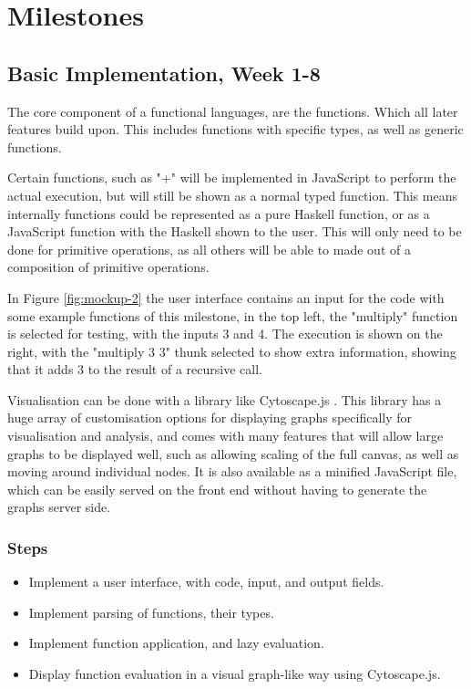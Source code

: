 \documentclass[a4paper]{article}
\begin{document}
\section{Milestones}
\subsection{Basic Implementation, Week 1-8}
The core component of a functional languages, are the functions. Which all later features build upon. This includes functions with specific types, as well as generic functions.

Certain functions, such as "+" will be implemented in JavaScript to perform the actual execution, but will still be shown as a normal typed function. This means internally functions could be represented as a pure Haskell function, or as a JavaScript function with the Haskell shown to the user. This will only need to be done for primitive operations, as all others will be able to made out of a composition of primitive operations.

In Figure \ref{fig:mockup-2} the user interface contains an input for the code with some example functions of this milestone, in the top left, the "multiply" function is selected for testing, with the inputs 3 and 4. The execution is shown on the right, with the "multiply 3 3" thunk selected to show extra information, showing that it adds 3 to the result of a recursive call.

Visualisation can be done with a library like Cytoscape.js \cite{cytoscape}. This library has a huge array of customisation options for displaying graphs specifically for visualisation and analysis, and comes with many features that will allow large graphs to be displayed well, such as allowing scaling of the full canvas, as well as moving around individual nodes. It is also available as a minified JavaScript file, which can be easily served on the front end without having to generate the graphs server side.
\subsubsection{Steps}
\begin{itemize}
    \item Implement a user interface, with code, input, and output fields.
    \item Implement parsing of functions, their types.
    \item Implement function application, and lazy evaluation.
    \item Display function evaluation in a visual graph-like way using Cytoscape.js.
\end{itemize}
\end{document}
